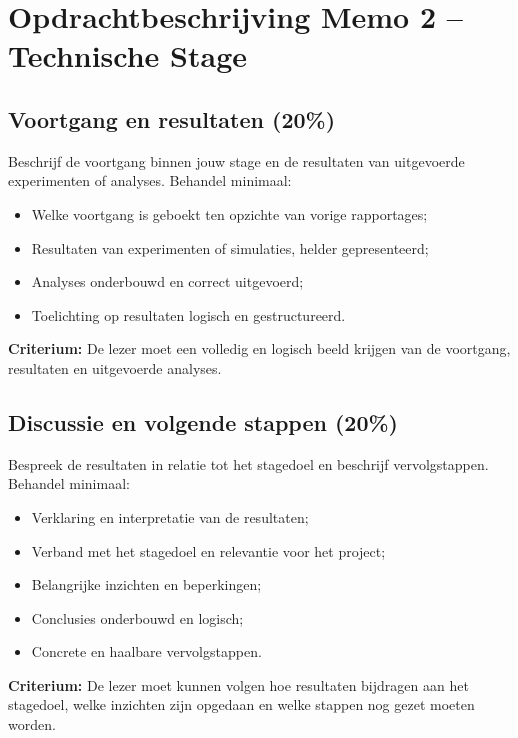 \documentclass[a4paper,11pt]{article}
\begin{document}
\section*{Opdrachtbeschrijving Memo 2 -- Technische Stage}
\subsection*{Voortgang en resultaten \textbf{(20\%)}}
Beschrijf de voortgang binnen jouw stage en de resultaten van uitgevoerde experimenten of analyses. Behandel minimaal:
\begin{itemize}[leftmargin=1.5cm, partopsep=1pt, itemsep=2pt, parsep=0pt]
    \item Welke voortgang is geboekt ten opzichte van vorige rapportages;
    \item Resultaten van experimenten of simulaties, helder gepresenteerd;
    \item Analyses onderbouwd en correct uitgevoerd;
    \item Toelichting op resultaten logisch en gestructureerd.
\end{itemize}

\textbf{Criterium:} De lezer moet een volledig en logisch beeld krijgen van de voortgang, resultaten en uitgevoerde analyses.

\subsection*{Discussie en volgende stappen \textbf{(20\%)}}
Bespreek de resultaten in relatie tot het stagedoel en beschrijf vervolgstappen. Behandel minimaal:
\begin{itemize}[leftmargin=1.5cm, partopsep=1pt, itemsep=2pt, parsep=0pt]
    \item Verklaring en interpretatie van de resultaten;
    \item Verband met het stagedoel en relevantie voor het project;
    \item Belangrijke inzichten en beperkingen;
    \item Conclusies onderbouwd en logisch;
    \item Concrete en haalbare vervolgstappen.
\end{itemize}

\textbf{Criterium:} De lezer moet kunnen volgen hoe resultaten bijdragen aan het stagedoel, welke inzichten zijn opgedaan en welke stappen nog gezet moeten worden.
\end{document}
